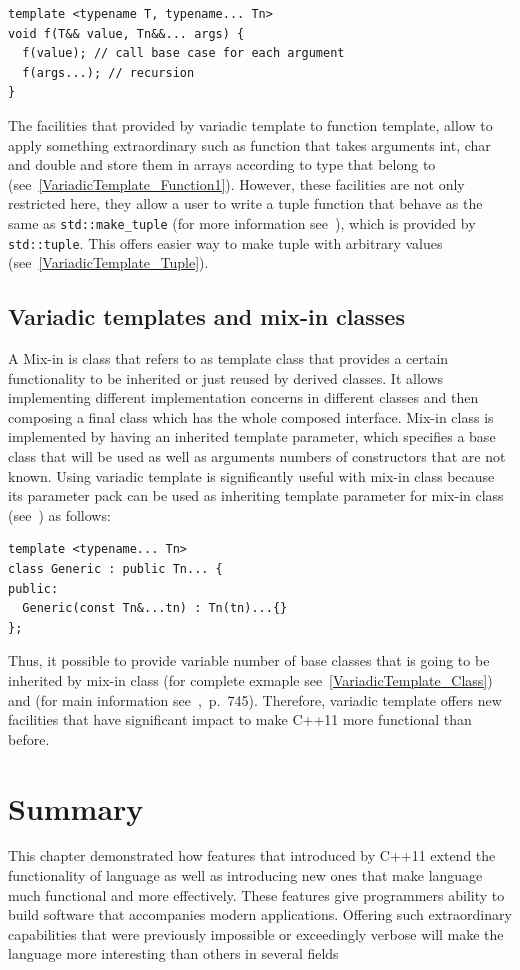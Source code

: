 \documentclass[11pt]{report}
\begin{document}
\begin{lstlisting}
template <typename T, typename... Tn>
void f(T&& value, Tn&&... args) {
  f(value); // call base case for each argument
  f(args...); // recursion
}
\end{lstlisting}
The facilities that provided by variadic template to function template, allow to apply something extraordinary such as function that takes arguments int, char and double and store them in arrays according to type that belong to (see~\ref{VariadicTemplate_Function1}). However, these facilities are not only restricted here, they allow a user to write a tuple function that behave as the same as \texttt{std::make\_tuple} (for more information see~\cite{Stroustrup:2012:Cpp11}), which is provided by \texttt{std::tuple}. This offers easier way to make tuple with arbitrary values (see~\ref{VariadicTemplate_Tuple}).


\subsection{Variadic templates and mix-in classes}
\label{subsection: Variadic Templates and Mix-In Classes}
A Mix-in is class that refers to as template class that provides a certain functionality to be inherited or just reused by derived classes. It allows implementing different implementation concerns in different classes and then composing a final class which has the whole composed interface. Mix-in class is implemented by having an inherited template parameter, which specifies a base class that will be used as well as arguments numbers of constructors that are not known. Using variadic template is significantly useful with mix-in class because its parameter pack can be used as inheriting template parameter for mix-in class (see~\cite{Gregor:2007:VTC}) as follows:
\begin{lstlisting}
template <typename... Tn>
class Generic : public Tn... {
public:
  Generic(const Tn&...tn) : Tn(tn)...{}
};
\end{lstlisting}
Thus, it possible to provide variable number of base classes that is going to be inherited by mix-in class (for complete exmaple see~\ref{VariadicTemplate_Class}) and (for main information see~\cite{Gregorie:professionalcpp},~p.~745). Therefore, variadic template offers new facilities that have significant impact to make C++11 more functional than before.

\section{Summary}
\label{section1: Summary}
This chapter demonstrated how features that introduced by C++11 extend the functionality of language as well as introducing new ones that make language much functional and more effectively. These features give programmers ability to build software that accompanies modern applications. Offering such extraordinary capabilities that were previously impossible or exceedingly verbose will make the language more interesting than others in several fields
\end{document}

